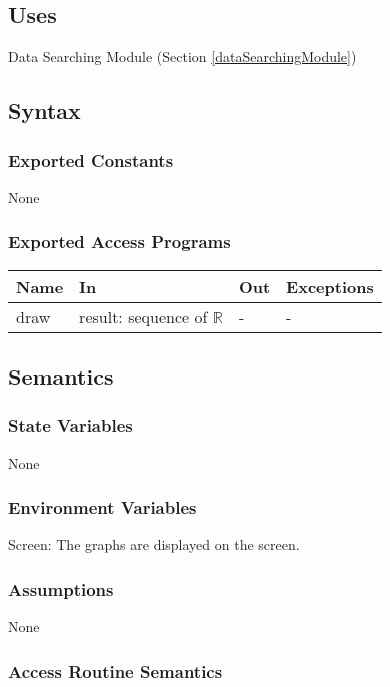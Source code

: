\documentclass[12pt, titlepage]{article}
\begin{document}
\subsection{Uses}

Data Searching Module (Section \ref{dataSearchingModule})


\subsection{Syntax}

\subsubsection{Exported Constants}
None
\subsubsection{Exported Access Programs}

\begin{center}
\begin{tabular}{p{2cm} p{4cm} p{7cm} p{2cm}}
\hline
\textbf{Name} & \textbf{In} & \textbf{Out} & \textbf{Exceptions} \\
\hline
draw & result: sequence of $\mathbb{R}$ & - & - \\
\hline
\end{tabular}
\end{center}

\subsection{Semantics}

\subsubsection{State Variables}
None

\subsubsection{Environment Variables}
Screen: The graphs are displayed on the screen.

\subsubsection{Assumptions}
None
\subsubsection{Access Routine Semantics}
\end{document}
